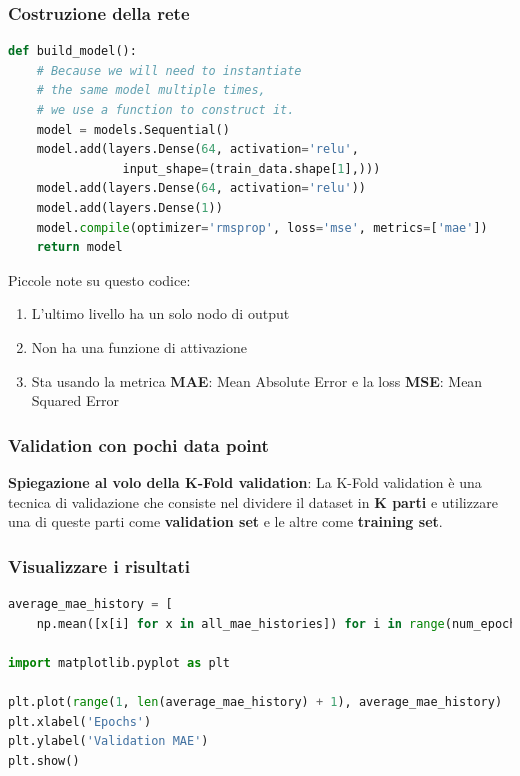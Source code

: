 \subsubsection{Costruzione della rete}
\begin{lstlisting}[language=Python]
def build_model():
    # Because we will need to instantiate
    # the same model multiple times,
    # we use a function to construct it.
    model = models.Sequential()
    model.add(layers.Dense(64, activation='relu',
                input_shape=(train_data.shape[1],)))
    model.add(layers.Dense(64, activation='relu'))
    model.add(layers.Dense(1))
    model.compile(optimizer='rmsprop', loss='mse', metrics=['mae'])
    return model
\end{lstlisting}

Piccole note su questo codice:
\begin{enumerate}
    \item L'ultimo livello ha un solo nodo di output
    \item Non ha una funzione di attivazione
    \item Sta usando la metrica \textbf{MAE}: Mean Absolute Error e la loss \textbf{MSE}: Mean Squared Error
\end{enumerate}

\subsubsection{Validation con pochi data point}
\label{subsubsec:validation_pochi_data_point}

\textbf{Spiegazione al volo della K-Fold validation}: La K-Fold validation è una tecnica di
validazione che consiste nel dividere il dataset in \textbf{K parti} e utilizzare una di 
queste parti come \textbf{validation set} e le altre come \textbf{training set}. 

\subsubsection{Visualizzare i risultati}

\begin{lstlisting}[language=Python]
average_mae_history = [
    np.mean([x[i] for x in all_mae_histories]) for i in range(num_epochs)]

import matplotlib.pyplot as plt

plt.plot(range(1, len(average_mae_history) + 1), average_mae_history)
plt.xlabel('Epochs')
plt.ylabel('Validation MAE')
plt.show()

\end{lstlisting}

